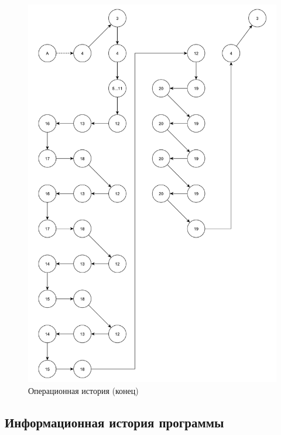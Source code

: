 \begin{figure}[h]
	\centering
	\includegraphics[height=0.9\textheight]{img/операционная_история_2.pdf}
	\caption{Операционная история (конец)}
	\label{fg:oi_2}
\end{figure}

\clearpage

\subsection{Информационная история программы}

